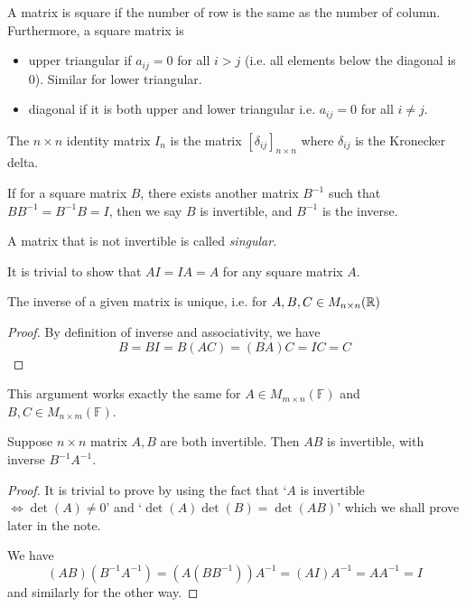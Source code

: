 \documentclass[11pt]{article}
\begin{document}
\begin{definition}
  A matrix is square if the number of row is the same as the number of column. Furthermore, a square matrix is 
  \begin{itemize}
    \item upper triangular if \(a_{ij}=0\) for all \(i>j\) (i.e. all elements below the diagonal is 0). Similar for lower triangular.
    \item diagonal if it is both upper and lower triangular i.e. \(a_{ij}=0\) for all \(i \neq j\).
  \end{itemize}
\end{definition}

\begin{definition}
  The \(n \times n\) identity matrix \(I_n\) is the matrix \([\delta_{ij}]_{n\times n}\) where \(\delta_{ij}\) is the Kronecker delta.\vspace{5pt}

  If for a square matrix \(B\), there exists another matrix \(B^{-1}\) such that \(BB^{-1}=B^{-1}B=I\), then we say \(B\) is invertible, and \(B^{-1}\) is the inverse.\vspace{5pt}

  A matrix that is not invertible is called \emph{singular}.
\end{definition}
It is trivial to show that \(AI=IA=A\) for any square matrix \(A\).

\begin{theorem}
  The inverse of a given matrix is unique, i.e. for \(A,B,C \in M_{n\times n}(\mathbb{R})\)
\end{theorem}
\begin{proof}
  By definition of inverse and associativity, we have
  \begin{equation*}
    B = BI = B(AC) = (BA)C = IC = C
  \end{equation*}
\end{proof}
This argument works exactly the same for \(A \in M_{m\times n}(\mathbb{F})\) and \(B,C \in M_{n\times m}(\mathbb{F})\).

\begin{theorem}
  Suppose \(n\times n\) matrix \(A,B\) are both invertible. Then \(AB\) is invertible, with inverse \(B^{-1}A^{-1}\).
\end{theorem}
\begin{proof}
  It is trivial to prove by using the fact that `\(A\) is invertible \(\iff \det(A)\neq 0\)' and `\(\det(A)\det(B)=\det(AB)\)' which we shall prove later in the note. 

  We have \begin{equation*}
    (AB)(B^{-1}A^{-1})=(A(BB^{-1}))A^{-1}=(AI)A^{-1}=AA^{-1}=I
  \end{equation*}
  and similarly for the other way.
\end{proof}
\end{document}
